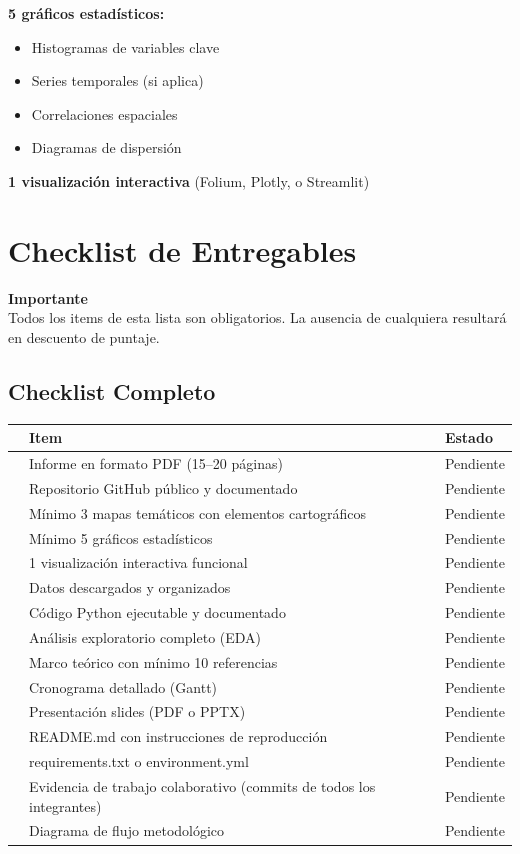 \documentclass[11pt,a4paper]{article}
\newcommand{\checkbox}{\ding{113}} %
\begin{document}
\textbf{5 gráficos estadísticos:}
\begin{itemize}[leftmargin=1.2cm]
  \item Histogramas de variables clave
  \item Series temporales (si aplica)
  \item Correlaciones espaciales
  \item Diagramas de dispersión
\end{itemize}

\textbf{1 visualización interactiva} (Folium, Plotly, o Streamlit)

\section{Checklist de Entregables}
\textbf{Importante}\\
Todos los items de esta lista son obligatorios. La ausencia de cualquiera resultará en descuento de puntaje.

\subsection{Checklist Completo}
\begin{table}[h!]
\centering
\begin{tabularx}{\linewidth}{@{}c X l@{}}
\toprule
 & \textbf{Item} & \textbf{Estado}\\
\midrule
\checkbox & Informe en formato PDF (15--20 páginas) & Pendiente\\
\checkbox & Repositorio GitHub público y documentado & Pendiente\\
\checkbox & Mínimo 3 mapas temáticos con elementos cartográficos & Pendiente\\
\checkbox & Mínimo 5 gráficos estadísticos & Pendiente\\
\checkbox & 1 visualización interactiva funcional & Pendiente\\
\checkbox & Datos descargados y organizados & Pendiente\\
\checkbox & Código Python ejecutable y documentado & Pendiente\\
\checkbox & Análisis exploratorio completo (EDA) & Pendiente\\
\checkbox & Marco teórico con mínimo 10 referencias & Pendiente\\
\checkbox & Cronograma detallado (Gantt) & Pendiente\\
\checkbox & Presentación slides (PDF o PPTX) & Pendiente\\
\checkbox & README.md con instrucciones de reproducción & Pendiente\\
\checkbox & requirements.txt o environment.yml & Pendiente\\
\checkbox & Evidencia de trabajo colaborativo (commits de todos los integrantes) & Pendiente\\
\checkbox & Diagrama de flujo metodológico & Pendiente\\
\bottomrule
\end{tabularx}
\end{table}
\end{document}
